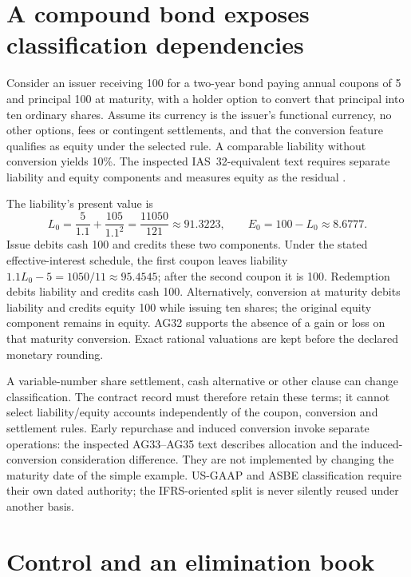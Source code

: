 \section{A compound bond exposes classification dependencies}

Consider an issuer receiving 100 for a two-year bond paying annual coupons of
5 and principal 100 at maturity, with a holder option to convert that principal
into ten ordinary shares. Assume its currency is the issuer's functional
currency, no other options, fees or contingent settlements, and that the
conversion feature qualifies as equity under the selected rule. A comparable
liability without conversion yields 10\%. The inspected IAS~32-equivalent
text requires separate liability and equity components and measures equity
as the residual \citep[paragraphs 28--32, AG30--AG32]{aasb132}.

The liability's present value is
\[
 L_0=\frac{5}{1.1}+\frac{105}{1.1^2}
     =\frac{11050}{121}\approx91.3223,
 \qquad E_0=100-L_0\approx8.6777.
\]
Issue debits cash 100 and credits these two components. Under the stated
effective-interest schedule, the first coupon leaves liability
$1.1L_0-5=1050/11\approx95.4545$; after the second coupon it is 100.
Redemption debits liability and credits cash 100. Alternatively, conversion
at maturity debits liability and credits equity 100 while issuing ten shares;
the original equity component remains in equity. AG32 supports the absence
of a gain or loss on that maturity conversion. Exact rational valuations are
kept before the declared monetary rounding.

A variable-number share settlement, cash alternative or other clause can
change classification. The contract record must therefore retain these terms;
it cannot select liability/equity accounts independently of the coupon,
conversion and settlement rules. Early repurchase and induced conversion
invoke separate operations: the inspected AG33--AG35 text describes allocation
and the induced-conversion consideration difference. They are not implemented
by changing the maturity date of the simple example. US-GAAP and ASBE
classification require their own dated authority; the IFRS-oriented split is
never silently reused under another basis.







\section{Control and an elimination book}

